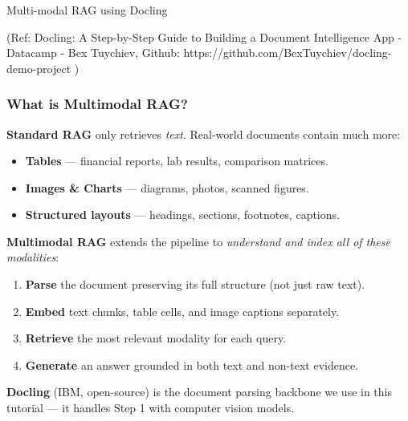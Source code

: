 \begin{frame}[fragile]\frametitle{}
\begin{center}
{\Large Multi-modal RAG using Docling}

{\tiny (Ref: Docling: A Step-by-Step Guide to Building a Document Intelligence App - Datacamp - Bex Tuychiev, Github: https://github.com/BexTuychiev/docling-demo-project )}
\end{center}
\end{frame}

\begin{frame}[fragile]\frametitle{What is Multimodal RAG?}

\textbf{Standard RAG} only retrieves \textit{text}. Real-world documents contain much more:

\begin{itemize}
  \item \textbf{Tables} --- financial reports, lab results, comparison matrices.
  \item \textbf{Images \& Charts} --- diagrams, photos, scanned figures.
  \item \textbf{Structured layouts} --- headings, sections, footnotes, captions.
\end{itemize}

\vspace{0.3em}
\textbf{Multimodal RAG} extends the pipeline to \textit{understand and index all of these modalities}:

\begin{enumerate}
  \item \textbf{Parse} the document preserving its full structure (not just raw text).
  \item \textbf{Embed} text chunks, table cells, and image captions separately.
  \item \textbf{Retrieve} the most relevant modality for each query.
  \item \textbf{Generate} an answer grounded in both text and non-text evidence.
\end{enumerate}

\vspace{0.3em}
{\small \textbf{Docling} (IBM, open-source) is the document parsing backbone we use in this tutorial --- it handles Step 1 with computer vision models.}

\end{frame}

